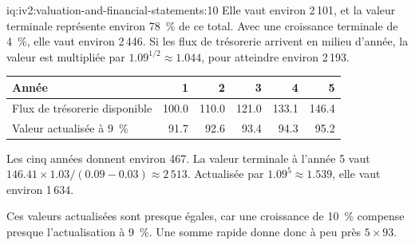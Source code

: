 \begin{solution}{iq:iv2:valuation-and-financial-statements:10}
Elle vaut environ 2\,101, et la valeur terminale représente environ 78~\% de ce total. Avec une croissance terminale de 4~\%, elle vaut environ 2\,446. Si les flux de trésorerie arrivent en milieu d'année, la valeur est multipliée par $1.09^{1/2} \approx 1.044$, pour atteindre environ 2\,193.
\begin{center}\small
\begin{tabular}{@{}lrrrrr@{}}
Année & 1 & 2 & 3 & 4 & 5 \\ \hline
Flux de trésorerie disponible & 100.0 & 110.0 & 121.0 & 133.1 & 146.4 \\
Valeur actualisée à 9~\% & 91.7 & 92.6 & 93.4 & 94.3 & 95.2
\end{tabular}
\end{center}
Les cinq années donnent environ 467. La valeur terminale à l'année 5 vaut $146.41 \times 1.03/(0.09 - 0.03) \approx 2\,513$. Actualisée par $1.09^5 \approx 1.539$, elle vaut environ 1\,634.

Ces valeurs actualisées sont presque égales, car une croissance de 10~\% compense presque l'actualisation à 9~\%. Une somme rapide donne donc à peu près $5 \times 93$.

\end{solution}

